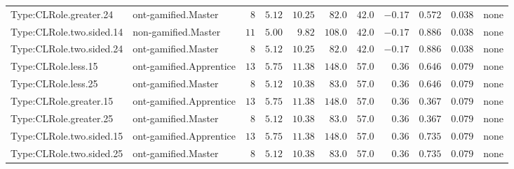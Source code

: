 \documentclass[6pt,a4paper]{article}
\begin{document}
{\begin{longtable}{llrrrrrrrrl}
Type:CLRole.greater.24&ont-gamified.Master&$ 8$&$5.12$&$10.25$&$ 82.0$&$ 42.0$&$-0.17$&$0.572$&$0.038$&none\tabularnewline
Type:CLRole.two.sided.14&non-gamified.Master&$11$&$5.00$&$ 9.82$&$108.0$&$ 42.0$&$-0.17$&$0.886$&$0.038$&none\tabularnewline
Type:CLRole.two.sided.24&ont-gamified.Master&$ 8$&$5.12$&$10.25$&$ 82.0$&$ 42.0$&$-0.17$&$0.886$&$0.038$&none\tabularnewline
Type:CLRole.less.15&ont-gamified.Apprentice&$13$&$5.75$&$11.38$&$148.0$&$ 57.0$&$ 0.36$&$0.646$&$0.079$&none\tabularnewline
Type:CLRole.less.25&ont-gamified.Master&$ 8$&$5.12$&$10.38$&$ 83.0$&$ 57.0$&$ 0.36$&$0.646$&$0.079$&none\tabularnewline
Type:CLRole.greater.15&ont-gamified.Apprentice&$13$&$5.75$&$11.38$&$148.0$&$ 57.0$&$ 0.36$&$0.367$&$0.079$&none\tabularnewline
Type:CLRole.greater.25&ont-gamified.Master&$ 8$&$5.12$&$10.38$&$ 83.0$&$ 57.0$&$ 0.36$&$0.367$&$0.079$&none\tabularnewline
\newpage
Type:CLRole.two.sided.15&ont-gamified.Apprentice&$13$&$5.75$&$11.38$&$148.0$&$ 57.0$&$ 0.36$&$0.735$&$0.079$&none\tabularnewline
Type:CLRole.two.sided.25&ont-gamified.Master&$ 8$&$5.12$&$10.38$&$ 83.0$&$ 57.0$&$ 0.36$&$0.735$&$0.079$&none\tabularnewline
\hline
\end{longtable}}
\end{document}
